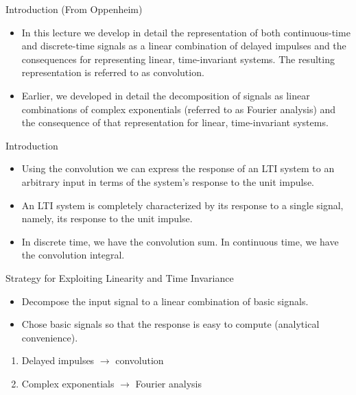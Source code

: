 \begin{frame}{Introduction (From Oppenheim)}
    \begin{itemize}
        \item In this lecture we develop in detail the representation of both continuous-time and discrete-time signals as a linear combination of delayed impulses and the consequences for representing linear, time-invariant systems. The resulting representation is referred to as convolution.
        \item Earlier, we developed in detail the decomposition of signals as linear combinations of complex exponentials (referred to as Fourier analysis) and the consequence of that representation for linear, time-invariant systems.
    \end{itemize}
\end{frame}

\begin{frame}{Introduction}
    \begin{itemize}
        \item Using the convolution we can express the response of an LTI system to an arbitrary input in terms of the system's response to the unit impulse.
        \item An LTI system is completely characterized by its response to a single signal, namely, its response to the unit impulse.
        \item In discrete time, we have the convolution sum. In continuous time, we have the convolution integral.
    \end{itemize}
\end{frame}

\begin{frame}{Strategy for Exploiting Linearity and Time Invariance}
    {
    \begin{itemize}
        \item Decompose the input signal to a linear combination of basic signals.
        \item   Chose basic signals so that the response is easy to compute (analytical convenience).
    \end{itemize}

    \begin{enumerate}
        \item Delayed impulses $\rightarrow$ convolution
        \item Complex exponentials $\rightarrow$ Fourier analysis
    \end{enumerate}
    }
\end{frame}


